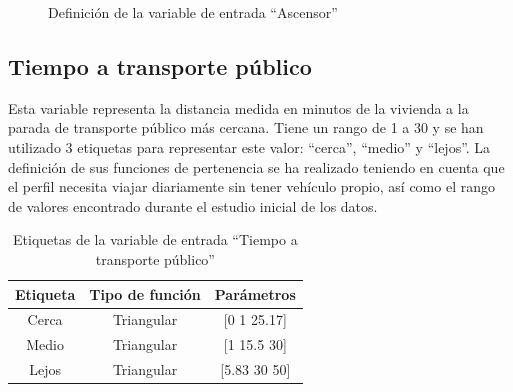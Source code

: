 \documentclass[12pt]{report} %
\begin{document}
        \begin{figure}[H]
            \centering
            \caption{Definición de la variable de entrada ``Ascensor''}
        \end{figure}

        \subsection{Tiempo a transporte público}
        Esta variable representa la distancia medida en minutos de la vivienda a la parada de transporte público más cercana.
        Tiene un rango de 1 a 30 y se han utilizado 3 etiquetas para representar este valor: ``cerca'', ``medio'' y ``lejos''.
        La definición de sus funciones de pertenencia se ha realizado teniendo en cuenta que el perfil necesita viajar 
        diariamente sin tener vehículo propio, así como el rango de valores encontrado durante el estudio inicial de los datos.

        \begin{table}[h]
            \center
            \begin{tabular}{@{}ccc@{}}
                \toprule
                \textbf{Etiqueta} & \textbf{Tipo de función} & \textbf{Parámetros} \\
                \midrule
                Cerca & Triangular & [0 1 25.17]  \\
                Medio & Triangular & [1 15.5 30]  \\
                Lejos & Triangular & [5.83 30 50] \\
                \bottomrule
            \end{tabular}
            \caption{Etiquetas de la variable de entrada ``Tiempo a transporte público''}
        \end{table}
\end{document}
